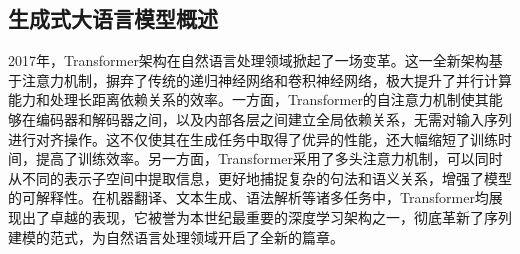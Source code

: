 \documentclass[a4paper]{report}
\begin{document}
\subsection{生成式大语言模型概述}
2017年，Transformer架构在自然语言处理领域掀起了一场变革。这一全新架构基于注意力机制，摒弃了传统的递归神经网络和卷积神经网络，极大提升了并行计算能力和处理长距离依赖关系的效率。一方面，Transformer的自注意力机制使其能够在编码器和解码器之间，以及内部各层之间建立全局依赖关系，无需对输入序列进行对齐操作。这不仅使其在生成任务中取得了优异的性能，还大幅缩短了训练时间，提高了训练效率。另一方面，Transformer采用了多头注意力机制，可以同时从不同的表示子空间中提取信息，更好地捕捉复杂的句法和语义关系，增强了模型的可解释性\cite{vaswani2017attention}。在机器翻译、文本生成、语法解析等诸多任务中，Transformer均展现出了卓越的表现，它被誉为本世纪最重要的深度学习架构之一，彻底革新了序列建模的范式，为自然语言处理领域开启了全新的篇章。
\end{document}
